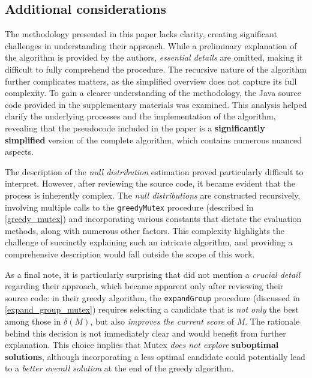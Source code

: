 \subsection{Additional considerations}

The methodology presented in this paper lacks clarity, creating significant challenges in understanding their approach. While a preliminary explanation of the algorithm is provided by the authors, \textit{essential details} are omitted, making it difficult to fully comprehend the procedure. The recursive nature of the algorithm further complicates matters, as the simplified overview does not capture its full complexity. To gain a clearer understanding of the methodology, the Java source code provided in the supplementary materials was examined. This analysis helped clarify the underlying processes and the implementation of the algorithm, revealing that the pseudocode included in the paper is a \textbf{significantly simplified} version of the complete algorithm, which contains numerous nuanced aspects.

The description of the \textit{null distribution} estimation proved particularly difficult to interpret. However, after reviewing the source code, it became evident that the process is inherently complex. The \textit{null distributions} are constructed recursively, involving multiple calls to the \texttt{greedyMutex} procedure (described in \cref{greedy_mutex}) and incorporating various constants that dictate the evaluation methods, along with numerous other factors. This complexity highlights the challenge of succinctly explaining such an intricate algorithm, and providing a comprehensive description would fall outside the scope of this work.

As a final note, it is particularly surprising that \textcite{mutex} did not mention a \textit{crucial detail} regarding their approach, which became apparent only after reviewing their source code: in their greedy algorithm, the \texttt{expandGroup} procedure (discussed in \cref{expand_group_mutex}) requires selecting a candidate that is \textit{not only} the best among those in $\delta(M)$, but also \textit{improves the current score} of $M$. The rationale behind this decision is not immediately clear and would benefit from further explanation. This choice implies that Mutex \textit{does not explore} \textbf{suboptimal solutions}, although incorporating a less optimal candidate could potentially lead to a \textit{better overall solution} at the end of the greedy algorithm.

